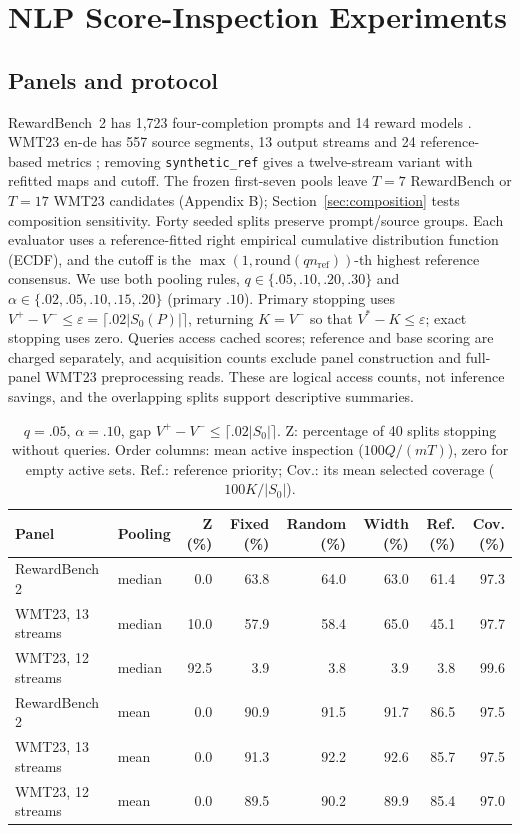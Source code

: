 \documentclass[11pt]{article}
\newcommand{\Sz}{S_0}
\begin{document}
\section{NLP Score-Inspection Experiments}
\label{sec:exp}
\subsection{Panels and protocol}
RewardBench~2 has 1,723 four-completion prompts and 14 reward models \citep{malik2026rewardbench2}. WMT23 en-de has 557 source segments, 13 output streams and 24 reference-based metrics \citep{freitag2023wmt23}; removing \texttt{synthetic\_ref} gives a twelve-stream variant with refitted maps and cutoff. The frozen first-seven pools leave $T=7$ RewardBench or $T=17$ WMT23 candidates (Appendix B); Section~\ref{sec:composition} tests composition sensitivity. Forty seeded splits preserve prompt/source groups. Each evaluator uses a reference-fitted right empirical cumulative distribution function (ECDF), and the cutoff is the $\max(1,\mathrm{round}(qn_{\mathrm{ref}}))$-th highest reference consensus. We use both pooling rules, $q\in\{.05,.10,.20,.30\}$ and $\alpha\in\{.02,.05,.10,.15,.20\}$ (primary $.10$). Primary stopping uses $V^+-V^-\le\varepsilon=\lceil.02|\Sz(P)|\rceil$, returning $K=V^-$ so that $V^*-K\le\varepsilon$; exact stopping uses zero. Queries access cached scores; reference and base scoring are charged separately, and acquisition counts exclude panel construction and full-panel WMT23 preprocessing reads. These are logical access counts, not inference savings, and the overlapping splits support descriptive summaries.

\begin{table}[t]
\centering\small
\begin{tabular}{@{}llrrrrrr@{}}
\toprule
Panel & Pooling & Z (\%) & Fixed (\%) & Random (\%) & Width (\%) & Ref. (\%) & Cov. (\%)\\
\midrule
RewardBench 2 & median & 0.0 & 63.8 & 64.0 & 63.0 & 61.4 & 97.3\\
WMT23, 13 streams & median & 10.0 & 57.9 & 58.4 & 65.0 & 45.1 & 97.7\\
WMT23, 12 streams & median & 92.5 & 3.9 & 3.8 & 3.9 & 3.8 & 99.6\\
RewardBench 2 & mean & 0.0 & 90.9 & 91.5 & 91.7 & 86.5 & 97.5\\
WMT23, 13 streams & mean & 0.0 & 91.3 & 92.2 & 92.6 & 85.7 & 97.5\\
WMT23, 12 streams & mean & 0.0 & 89.5 & 90.2 & 89.9 & 85.4 & 97.0\\
\bottomrule
\end{tabular}
\caption{$q=.05$, $\alpha=.10$, gap $V^+-V^-\le\lceil.02|\Sz|\rceil$. Z: percentage of 40 splits stopping without queries. Order columns: mean active inspection ($100Q/(mT)$), zero for empty active sets. Ref.: reference priority; Cov.: its mean selected coverage ($100K/|\Sz|$).}
\label{tab:inspection}
\end{table}
\end{document}
